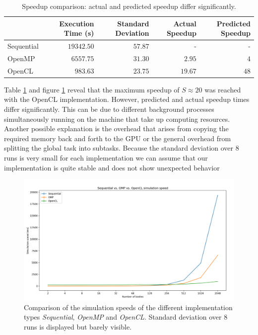 \documentclass[a4paper,11pt]{scrartcl} %
\begin{document}
\renewcommand{\arraystretch}{1.3}
\begin{table}[h!]
  \begin{tabular}{l|rrrr}
    & Execution Time (s) & Standard Deviation &  Actual Speedup & Predicted Speedup \\ \hline
    Sequential & $19342.50$ & $57.87$ & - & -\\
    OpenMP & $6557.75$ & $31.30$ & $2.95$ & $4$\\
    OpenCL & $983.63$ & $23.75$ & $19.67$ & $48$
  \end{tabular}  
  \caption{Speedup comparison: actual and predicted speedup differ significantly.}
  \label{table:speedup}
\end{table}

Table \ref{table:speedup} and figure \ref{fig:benchmark_compare} reveal that the maximum speedup of $S\approx 20$ was reached with the OpenCL implementation. However, predicted and actual speedup times differ significantly. This can be due to different background processes simultaneously running on the machine that take up computing resources. Another possible explanation is the overhead that arises from copying the required memory back and forth to the GPU or the general overhead from splitting the global task into subtasks. Because the standard deviation over 8 runs is very small for each implementation we can assume that our implementation is quite stable and does not show unexpected behavior

\begin{figure}[h!]
  \centering
  \includegraphics[width=\textwidth]{img/benchmark_compare.png}
  \caption{Comparison of the simulation speeds of the different implementation types \textit{Sequential}, \textit{OpenMP} and \textit{OpenCL}. Standard deviation over 8 runs is displayed but barely visible.}
  \label{fig:benchmark_compare}
\end{figure}
\end{document}
